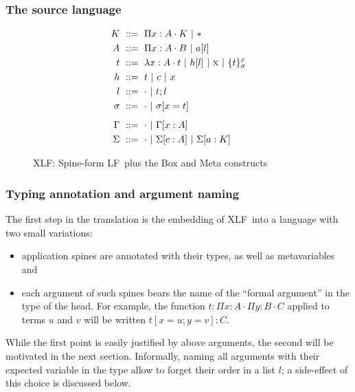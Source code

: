 \documentclass[preprint]{sigplanconf}
\newcommand\gor{\ |\ }
\newcommand\gequal{\ ::=\ }
\newcommand\meta[1]{\textsc{#1}}
\newcommand\mv{x}
\newcommand\mmeta{\meta x}
\newcommand\mco{c}
\newcommand\mcf{a}
\newcommand\postbinder{\cdot}
\newcommand\prd[2]{\Pi{#1}:{#2}\postbinder}
\newcommand\tlam[2]{\lambda{#1}:{#2}\postbinder}
\newcommand\lam{\tlam}
\newcommand\obox[3]{\{{#1}\}^{#2}_{#3}}
\newcommand\srt[1]{\mathsf{#1}}
\newcommand\type{\srt *}
\newcommand\lapp[2]{{#1}[{#2}]}
\newcommand\laapp[3]{{#1}[{#2}]:{#3}}
\newcommand\lnil{\cdot}
\newcommand\lcons[2]{{#1};{#2}}
\newcommand\lncons[3]{{#1}={#2};{#3}}
\newcommand\lnsing[2]{{#1}={#2}}
\newcommand\enil\cdot
\newcommand\eent[1]{[{#1}]}
\newcommand\econs[2]{{#1}\eent{#2}}
\newcommand\ebinddecl[3]{\econs{#1}{{#2}:{#3}}}
\newcommand\snil\enil
\newcommand\sent[2]{[{#1}={#2}]}
\newcommand\scons[3]{{#1}\sent{#2}{#3}}
\newcommand\lang[1]{\textsf{#1}}
\newcommand\LF{\lang{LF}}
\newcommand\XLF{\lang{XLF}}
\newcommand\XLFmod[1]{#1}
\def\inXLF{\def\thelangmod{\XLFmod}}
\newcommand\mk{\thelangmod{K}}
\newcommand\mf{\thelangmod{A}}
\newcommand\mmf{\thelangmod{B}}
\newcommand\mo{\thelangmod{t}}
\newcommand\mh{\thelangmod{h}}
\newcommand\ma{\thelangmod{l}}
\newcommand\ms{\thelangmod{\sigma}}
\newcommand\me{\thelangmod{\Gamma}}
\newcommand\msi{\thelangmod{\Sigma}}
\begin{document}
\subsubsection{The source language}

\begin{figure}
  \inXLF
  \begin{align*}
    \mk &\gequal { \prd\mv\mf\mk \gor \type } \\
    \mf &\gequal { \prd\mv\mf\mmf \gor \lapp\mcf\ma } \\
    \mo &\gequal { \lam\mv\mf\mo \gor \lapp\mh\ma \gor \mmeta \gor \obox\mo\mv\ms } \\
    \mh &\gequal { \mo \gor \mco \gor \mv } \\
    \ma &\gequal { \lnil \gor \lcons\mo\ma } \\
    \ms &\gequal { \snil \gor \scons \sigma\mv\mo } \\[0.5em]
    \me &\gequal { \enil \gor \ebinddecl \Gamma\mv\mf } \\
    \msi &\gequal { \enil \gor \ebinddecl\msi\mco\mf \gor
      \ebinddecl\msi\mcf\mk }
  \end{align*}
  \caption{\XLF: Spine-form \LF\ plus the \textsf{Box} and \textsf{Meta} constructs}
\end{figure}

\subsubsection{Typing annotation and argument naming}

The first step in the translation is the embedding of \XLF\ into a
language with two small variations:
\begin{itemize}
\item application spines are annotated with their types, as well as
  metavariables and
\item each argument of such spines bears the name of the ``formal
  argument'' in the type of the head. For example, the function $t :
  \prd x A \prd y B C$ applied to terms $u$ and $v$ will be written
  $\laapp{t}{\lncons x u {\lnsing y v}} C$.
\end{itemize}

While the first point is easily justified by above arguments, the
second will be motivated in the next section. Informally, naming all
arguments with their expected variable in the type allow to forget
their order in a list $l$; a side-effect of this choice is discussed
below.
\end{document}
